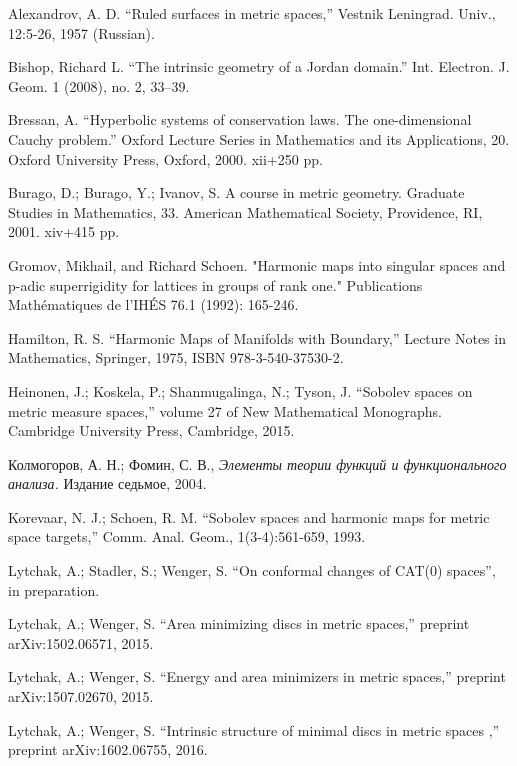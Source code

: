 \documentclass{article}
\begin{document}
\begin{thebibliography}{52}

 Alexandrov, A. D. ``Ruled  surfaces  in  metric  spaces,'' Vestnik Leningrad. Univ., 12:5-26, 1957 (Russian).

Bishop, Richard L.
``The intrinsic geometry of a Jordan domain.''
Int. Electron. J. Geom. 1 (2008), no. 2, 33--39. 

 Bressan, A.
``Hyperbolic systems of conservation laws.
The one-dimensional Cauchy problem.'' 
Oxford Lecture Series in Mathematics and its Applications, 20. 
Oxford University Press, Oxford, 2000. 
xii+250 pp.

Burago, D.; Burago, Y.; Ivanov, S.
A course in metric geometry.
Graduate Studies in Mathematics, 33. American Mathematical Society, Providence, RI, 2001. xiv+415 pp.

 Gromov, Mikhail, and Richard Schoen. "Harmonic maps into singular spaces and p-adic superrigidity for lattices in groups of rank one." Publications Mathématiques de l'IHÉS 76.1 (1992): 165-246.

 Hamilton, R. S. ``Harmonic Maps of Manifolds with Boundary,'' Lecture Notes in Mathematics, Springer, 1975, ISBN 978-3-540-37530-2.

 Heinonen, J.;  Koskela, P.;  Shanmugalinga, N.; Tyson, J. ``Sobolev spaces on metric measure spaces,''
volume 27 of New Mathematical Monographs. Cambridge University Press, Cambridge, 2015.

\begin{otherlanguage}{russian}
Колмогоров, А. Н.;
Фомин, С. В.,
\textit{Элементы теории функций и функционального анализа.}
Издание седьмое, 2004.
\end{otherlanguage}

Korevaar, N. J.; Schoen, R. M. ``Sobolev spaces and harmonic maps for metric space targets,'' Comm. Anal. Geom., 1(3-4):561-659, 1993.

 Lytchak, A.; Stadler, S.; Wenger, S.  ``On conformal changes of CAT(0) spaces'', in preparation.

Lytchak, A.; Wenger, S. ``Area minimizing discs in metric spaces,'' preprint arXiv:1502.06571, 2015.

Lytchak, A.; Wenger, S. ``Energy and area minimizers in metric spaces,'' preprint  arXiv:1507.02670, 2015.

Lytchak, A.; Wenger, S. ``Intrinsic structure of minimal discs in metric spaces ,'' preprint  arXiv:1602.06755, 2016.


\end{thebibliography}
\end{document}
